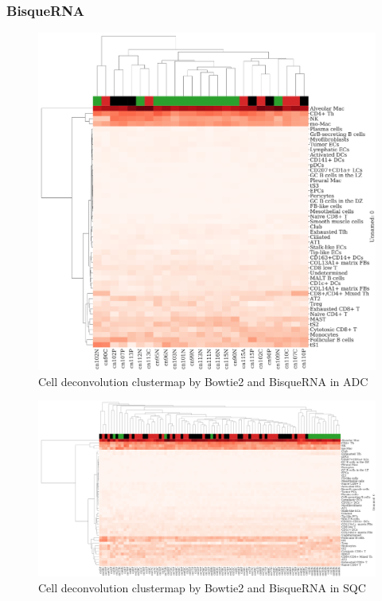\documentclass[11pt,a4paper,onecolumn,oneside]{report}
\begin{document}
            \subsubsection{BisqueRNA}
                \begin{figure}[p]
                    \centering
                    \includegraphics[width=0.6 \linewidth]{figures/BisqueRNA/clustermap/Bowtie2.ADC.cluster.pdf}
                    \caption{Cell deconvolution clustermap by Bowtie2 and BisqueRNA in ADC}
                    \label{fig:Deconvolution-BisqueRNA-Bowtie2-cluster-ADC}
                \end{figure}

                \begin{figure}[p]
                    \centering
                    \includegraphics[width=\linewidth]{figures/BisqueRNA/clustermap/Bowtie2.SQC.cluster.pdf}
                    \caption{Cell deconvolution clustermap by Bowtie2 and BisqueRNA in SQC}
                    \label{fig:Deconvolution-BisqueRNA-Bowtie2-cluster-SQC}
                \end{figure}
\end{document}
